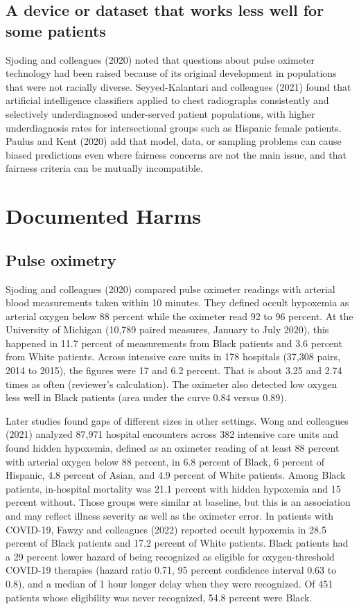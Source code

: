 \documentclass[12pt]{article}
\begin{document}
\subsection*{A device or dataset that works less well for some patients}
Sjoding and colleagues (2020) noted that questions about pulse oximeter technology had been raised because of its original development in populations that were not racially diverse. Seyyed-Kalantari and colleagues (2021) found that artificial intelligence classifiers applied to chest radiographs consistently and selectively underdiagnosed under-served patient populations, with higher underdiagnosis rates for intersectional groups such as Hispanic female patients. Paulus and Kent (2020) add that model, data, or sampling problems can cause biased predictions even where fairness concerns are not the main issue, and that fairness criteria can be mutually incompatible.

\section*{Documented Harms}
\subsection*{Pulse oximetry}
Sjoding and colleagues (2020) compared pulse oximeter readings with arterial blood measurements taken within 10 minutes. They defined occult hypoxemia as arterial oxygen below 88 percent while the oximeter read 92 to 96 percent. At the University of Michigan (10,789 paired measures, January to July 2020), this happened in 11.7 percent of measurements from Black patients and 3.6 percent from White patients. Across intensive care units in 178 hospitals (37,308 pairs, 2014 to 2015), the figures were 17 and 6.2 percent. That is about 3.25 and 2.74 times as often (reviewer's calculation). The oximeter also detected low oxygen less well in Black patients (area under the curve 0.84 versus 0.89).

Later studies found gaps of different sizes in other settings. Wong and colleagues (2021) analyzed 87,971 hospital encounters across 382 intensive care units and found hidden hypoxemia, defined as an oximeter reading of at least 88 percent with arterial oxygen below 88 percent, in 6.8 percent of Black, 6 percent of Hispanic, 4.8 percent of Asian, and 4.9 percent of White patients. Among Black patients, in-hospital mortality was 21.1 percent with hidden hypoxemia and 15 percent without. Those groups were similar at baseline, but this is an association and may reflect illness severity as well as the oximeter error. In patients with COVID-19, Fawzy and colleagues (2022) reported occult hypoxemia in 28.5 percent of Black patients and 17.2 percent of White patients. Black patients had a 29 percent lower hazard of being recognized as eligible for oxygen-threshold COVID-19 therapies (hazard ratio 0.71, 95 percent confidence interval 0.63 to 0.8), and a median of 1 hour longer delay when they were recognized. Of 451 patients whose eligibility was never recognized, 54.8 percent were Black.
\end{document}
